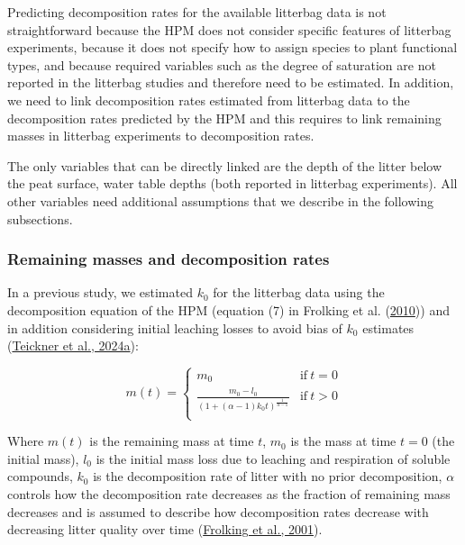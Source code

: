\documentclass[
  12pt,
]{article}
\begin{document}
Predicting decomposition rates for the available litterbag data is not straightforward because the HPM does not consider specific features of litterbag experiments, because it does not specify how to assign species to plant functional types, and because required variables such as the degree of saturation are not reported in the litterbag studies and therefore need to be estimated. In addition, we need to link decomposition rates estimated from litterbag data to the decomposition rates predicted by the HPM and this requires to link remaining masses in litterbag experiments to decomposition rates.

The only variables that can be directly linked are the depth of the litter below the peat surface, water table depths (both reported in litterbag experiments). All other variables need additional assumptions that we describe in the following subsections.

\hypertarget{sdm-003-methods-3}{%
\subsubsection{Remaining masses and decomposition rates}\label{sdm-003-methods-3}}

In a previous study, we estimated \(k_0\) for the litterbag data using the decomposition equation of the HPM (equation (7) in Frolking et al. (\protect\hyperlink{ref-Frolking.2010}{2010})) and in addition considering initial leaching losses to avoid bias of \(k_0\) estimates (\protect\hyperlink{ref-Teickner.2024}{Teickner et al., 2024a}):

\begin{equation}
m(t) = \begin{cases}
m_0 & \mathrm{if}~t=0\\
\frac{m_0 - l_0}{(1 + (\alpha - 1) k_0 t)^{\frac{1}{\alpha - 1}}} & \mathrm{if}~t>0\\
\end{cases}
\label{eq:decomposition-solution-2-with-leaching-1}
\end{equation}

Where \(m(t)\) is the remaining mass at time \(t\), \(m_0\) is the mass at time \(t=0\) (the initial mass), \(l_0\) is the initial mass loss due to leaching and respiration of soluble compounds, \(k_0\) is the decomposition rate of litter with no prior decomposition, \(\alpha\) controls how the decomposition rate decreases as the fraction of remaining mass decreases and is assumed to describe how decomposition rates decrease with decreasing litter quality over time (\protect\hyperlink{ref-Frolking.2001}{Frolking et al., 2001}).
\end{document}
